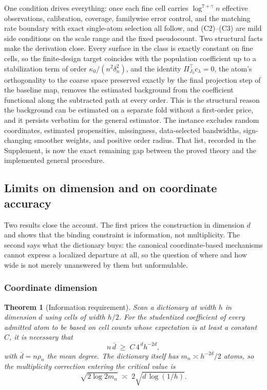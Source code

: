 \documentclass[11pt]{article}
\newtheorem{theorem}{Theorem}[section]
\theoremstyle{definition}
\newcommand{\1}{\mathbf 1}\newcommand{\op}{\operatorname}
\begin{document}
One condition drives everything: once each fine cell carries
$\log^{7+\gamma}n$ effective observations, calibration, coverage, familywise
error control, and the matching rate boundary with exact single-atom selection all
follow, and (C2)--(C3) are
mild side conditions on the scale range and the fixed pseudocount.  Two
structural facts make the derivation close.  Every surface in the class is
exactly constant on fine cells, so the finite-design target coincides with the
population coefficient up to a stabilization term of order
$\kappa_0/(n^2\delta_n^2)$, and the identity $\Pi_{J_0}^\top c_\lambda=0$, the
atom's orthogonality to the coarse space preserved exactly by the final
projection step of the baseline map, removes the estimated background from the
coefficient functional along the subtracted path at every order.  This is the
structural reason the background can be estimated on a separate fold without a
first-order price, and it persists verbatim for the general estimator.  The
instance excludes random coordinates, estimated propensities, missingness,
data-selected bandwidths, sign-changing smoother weights, and positive order
radius.  That list, recorded in the Supplement, is now the exact remaining gap
between the proved theory and the implemented general procedure.


\subsection{Limits on dimension and on coordinate accuracy} \label{app:sec-thy-limits}


Two results close the account.  The first prices the construction in dimension
$d$ and shows that the binding constraint is information, not
multiplicity.  The second says what the dictionary buys: the canonical
coordinate-based mechanisms cannot express a localized departure at all, so the
question of where and how wide is not merely unanswered by them but
unformulable.

\subsubsection{Coordinate dimension}

\begin{theorem}[Information requirement]                      \label{app:thm-info}
Scan a dictionary at width $h$ in dimension $d$ using cells of width $h/2$.
For the studentized coefficient of every admitted atom to be based on cell
counts whose expectation is at least a constant $C$, it is necessary that
\begin{equation}
n\,\bar d\;\ge\;C\,4^{\,d}h^{-2d},
\label{app:eq-inforule}
\end{equation}
with $\bar d=n\rho_n$ the mean degree.  The dictionary itself has
$m_n\asymp h^{-2d}/2$ atoms, so the multiplicity correction entering the
critical value is
\begin{equation}
\sqrt{2\log 2m_n}\;\asymp\;2\sqrt{d\,\log(1/h)} .
\label{app:eq-multrule}
\end{equation}
\end{theorem}
\end{document}
